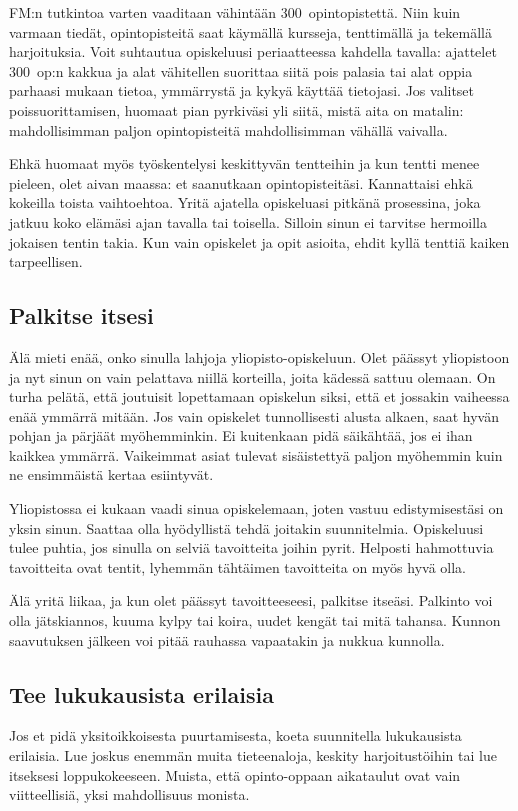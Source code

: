 \documentclass[a5paper, 8pt, twocolumn]{book} %
\numberwithin{equation}{section}
\begin{document}
FM:n tutkintoa varten vaaditaan vähintään
300~opinto\-pistettä. Niin kuin varmaan
tiedät, opinto\-pisteitä saat käymällä kursseja,
tenttimällä ja tekemällä harjoituksia.
Voit suhtautua opiskeluusi periaatteessa
kahdella tavalla: ajattelet 300~op:n kakkua
ja alat vähitellen suorittaa siitä pois palasia
tai alat oppia parhaasi mukaan tietoa,
ymmärrystä ja kykyä käyttää tietojasi. Jos
valitset pois\-suorittamisen, huomaat pian
pyrkiväsi yli siitä, mistä aita on matalin:
mahdollisimman paljon opinto\-pisteitä
mahdollisimman vähällä vaivalla.

Ehkä huomaat myös työskentelysi keskittyvän
tentteihin ja kun tentti menee pieleen, olet
aivan maassa: et saanutkaan opintopisteitäsi.
Kannattaisi ehkä kokeilla toista vaihtoehtoa.
Yritä ajatella opiskeluasi pitkänä
prosessina, joka jatkuu koko elämäsi ajan
tavalla tai toisella. Silloin sinun ei tarvitse
hermoilla jokaisen tentin takia. Kun vain
opiskelet ja opit asioita, ehdit kyllä tenttiä
kaiken tarpeellisen.
\subsection*{Palkitse itsesi}
Älä mieti enää, onko sinulla lahjoja
yliopisto-opiskeluun. Olet päässyt yliopistoon
ja nyt sinun on vain pelattava niillä
korteilla, joita kädessä sattuu olemaan.
On turha pelätä,
että joutuisit lopettamaan
opiskelun siksi, että et jossakin vaiheessa
enää ymmärrä mitään. Jos vain opiskelet
tunnollisesti
alusta alkaen, saat hyvän
pohjan ja pärjäät myöhemminkin. Ei kuitenkaan
pidä säikähtää, jos ei ihan kaikkea
ymmärrä. Vaikeimmat asiat tulevat sisäistettyä
paljon
myöhemmin kuin ne ensimmäistä
kertaa
esiintyvät.

Yliopistossa ei kukaan vaadi sinua opiskelemaan,
joten vastuu edistymisestäsi on
yksin sinun. Saattaa olla hyödyllistä tehdä
joitakin suunnitelmia. Opiskeluusi tulee
puhtia, jos sinulla on selviä tavoitteita joihin
pyrit. Helposti hahmottuvia tavoitteita
ovat tentit, lyhemmän tähtäimen tavoitteita
on myös hyvä olla.

Älä yritä liikaa, ja kun olet päässyt tavoitteeseesi,
palkitse itseäsi. Palkinto voi
olla jätskiannos, kuuma kylpy tai koira,
uudet kengät tai mitä tahansa. Kunnon
saavutuksen
jälkeen voi pitää rauhassa vapaatakin
ja nukkua kunnolla.

\subsection*{Tee lukukausista erilaisia}
Jos et pidä yksitoikkoisesta puurtamisesta,
koeta suunnitella lukukausista erilaisia.
Lue joskus enemmän muita tieteenaloja,
keskity harjoitustöihin tai lue itseksesi
loppukokeeseen. Muista, että opinto-oppaan
aikataulut ovat vain viitteellisiä, yksi
mahdollisuus monista.
\end{document}
